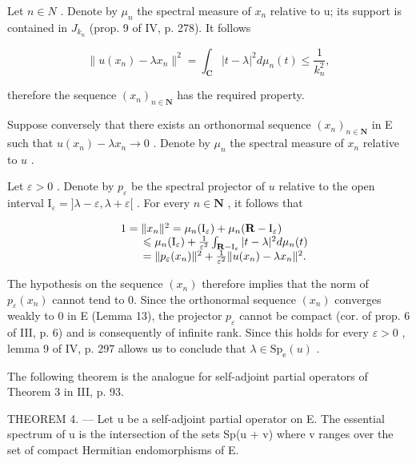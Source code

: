 Let \(n \in N\) . Denote by \(\mu_{n}\) the spectral measure of \(x_{n}\) relative to u; its support is contained in \(J_{k_{n}}\) (prop. 9 of IV, p. 278). It follows

\[
\| u (x _ {n}) - \lambda x _ {n} \| ^ {2} = \int_ {\mathbf {C}} | t - \lambda | ^ {2} d \mu_ {n} (t) \leqslant \frac {1}{k _ {n} ^ {2}},
\]

therefore the sequence \((x_{n})_{n\in\mathbf{N}}\) has the required property.

Suppose conversely that there exists an orthonormal sequence \((x_{n})_{n\in \mathbf{N}}\) in E such that \(u(x_{n}) - \lambda x_{n}\to 0\) . Denote by \(\mu_{n}\) the spectral measure of \(x_{n}\) relative to \(u\) .

Let \(\varepsilon > 0\) . Denote by \(p_{\varepsilon}\) be the spectral projector of \(u\) relative to the open interval \(\mathrm{I}_{\varepsilon} = ]\lambda - \varepsilon, \lambda + \varepsilon[\) . For every \(n \in \mathbf{N}\) , it follows that

\[
\begin{array}{r l} & 1 = \| x _ {n} \| ^ {2} = \mu_ {n} (\mathrm{I} _ {\varepsilon}) + \mu_ {n} (\mathbf {R} - \mathrm{I} _ {\varepsilon}) \\ & \qquad \leqslant \mu_ {n} (\mathrm{I} _ {\varepsilon}) + \frac {1}{\varepsilon^ {2}} \int_ {\mathbf {R} - \mathrm{I} _ {\varepsilon}} | t - \lambda | ^ {2} d \mu_ {n} (t) \\ & \qquad = \| p _ {\varepsilon} (x _ {n}) \| ^ {2} + \frac {1}{\varepsilon^ {2}} \| u (x _ {n}) - \lambda x _ {n} \| ^ {2}. \end{array}
\]

The hypothesis on the sequence \((x_{n})\) therefore implies that the norm of \(p_{\varepsilon}(x_{n})\) cannot tend to 0. Since the orthonormal sequence \((x_{n})\) converges weakly to 0 in E (Lemma 13), the projector \(p_{\varepsilon}\) cannot be compact (cor. of prop. 6 of III, p. 6) and is consequently of infinite rank. Since this holds for every \(\varepsilon > 0\) , lemma 9 of IV, p. 297 allows us to conclude that \(\lambda \in \mathrm{Sp}_{\mathrm{e}}(u)\) .

The following theorem is the analogue for self-adjoint partial operators of Theorem 3 in III, p. 93.

THEOREM 4. --- Let u be a self-adjoint partial operator on E. The essential spectrum of u is the intersection of the sets Sp(u + v) where v ranges over the set of compact Hermitian endomorphisms of E.

